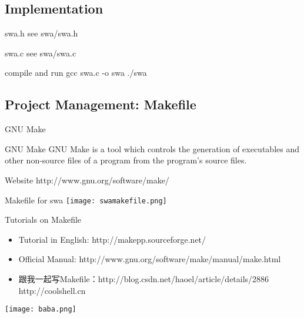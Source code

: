 \documentclass[UTF8]{beamer}
\begin{document}
\subsection{Implementation}
\begin{frame}[t]{swa.h}
  see swa/swa.h
\end{frame}

\begin{frame}[t]{swa.c}
  see swa/swa.c
\end{frame}

\begin{frame}[t]{compile and run}
  gcc swa.c -o swa
  ./swa
\end{frame}

\subsection{Project Management: Makefile}

\begin{frame}[t]{GNU Make}
\begin{block}{GNU Make}
  GNU Make is a tool which controls the generation of executables and other
  non-source files of a program from the program's source files.
\end{block}
\begin{block}{Website}
  http://www.gnu.org/software/make/
\end{block}
\end{frame}

\begin{frame}[t]{Makefile for swa}
\texttt{[image: swamakefile.png]}
\end{frame}

\begin{frame}[t]{Tutorials on Makefile}
\begin{itemize}
  \item Tutorial in English: http://makepp.sourceforge.net/
  \item Official Manual: http://www.gnu.org/software/make/manual/make.html
  \item 跟我一起写Makefile：http://blog.csdn.net/haoel/article/details/2886\\
  http://coolshell.cn
\end{itemize}
\end{frame}

\begin{frame}[t]
  \centerline{\texttt{[image: baba.png]}}
\end{frame}
\end{document}
